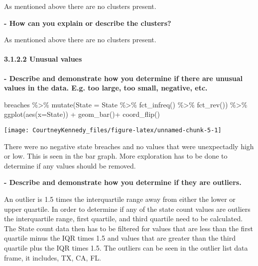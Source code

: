 \documentclass[
]{article}
\newenvironment{Shaded}{\begin{snugshade}}{\end{snugshade}}
\newcommand{\AttributeTok}[1]{\textcolor[rgb]{0.77,0.63,0.00}{#1}}
\newcommand{\FunctionTok}[1]{\textcolor[rgb]{0.00,0.00,0.00}{#1}}
\newcommand{\NormalTok}[1]{#1}
\newcommand{\SpecialCharTok}[1]{\textcolor[rgb]{0.00,0.00,0.00}{#1}}
\begin{document}
As mentioned above there are no clusters present.

\textbf{- How can you explain or describe the clusters?}

As mentioned above there are no clusters present.

\hypertarget{unusual-values}{%
\paragraph{3.1.2.2 Unusual values}\label{unusual-values}}

\textbf{- Describe and demonstrate how you determine if there are
unusual values in the data. E.g. too large, too small, negative, etc.}

\begin{Shaded}
\begin{Highlighting}[]
\NormalTok{breaches }\SpecialCharTok{\%\textgreater{}\%}
  \FunctionTok{mutate}\NormalTok{(}\AttributeTok{State =}\NormalTok{ State }\SpecialCharTok{\%\textgreater{}\%} \FunctionTok{fct\_infreq}\NormalTok{() }\SpecialCharTok{\%\textgreater{}\%} \FunctionTok{fct\_rev}\NormalTok{()) }\SpecialCharTok{\%\textgreater{}\%}
  \FunctionTok{ggplot}\NormalTok{(}\FunctionTok{aes}\NormalTok{(}\AttributeTok{x=}\NormalTok{State)) }\SpecialCharTok{+}
  \FunctionTok{geom\_bar}\NormalTok{()}\SpecialCharTok{+}
  \FunctionTok{coord\_flip}\NormalTok{()}
\end{Highlighting}
\end{Shaded}

\begin{center}\texttt{[image: CourtneyKennedy\_files/figure-latex/unnamed-chunk-5-1]} \end{center}

There were no negative state breaches and no values that were
unexpectadly high or low. This is seen in the bar graph. More
exploration has to be done to determine if any values should be removed.

\textbf{- Describe and demonstrate how you determine if they are
outliers.}

An outlier is 1.5 times the interquartile range away from either the
lower or upper quartile. In order to determine if any of the state count
values are outliers the interquartile range, first quartile, and third
quartile need to be calculated. The State count data then has to be
filtered for values that are less than the first quartile minus the IQR
times 1.5 and values that are greater than the third quartile plus the
IQR times 1.5. The outliers can be seen in the outlier list data frame,
it includes, TX, CA, FL.
\end{document}
